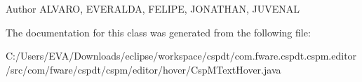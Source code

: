 \begin{DoxyAuthor}{Author}
A\+L\+V\+A\+RO, E\+V\+E\+R\+A\+L\+DA, F\+E\+L\+I\+PE, J\+O\+N\+A\+T\+H\+AN, J\+U\+V\+E\+N\+AL 
\end{DoxyAuthor}


The documentation for this class was generated from the following file\+:\begin{DoxyCompactItemize}
\item 
C\+:/\+Users/\+E\+V\+A/\+Downloads/eclipse/workspace/cspdt/com.\+fware.\+cspdt.\+cspm.\+editor/src/com/fware/cspdt/cspm/editor/hover/Csp\+M\+Text\+Hover.\+java\end{DoxyCompactItemize}
